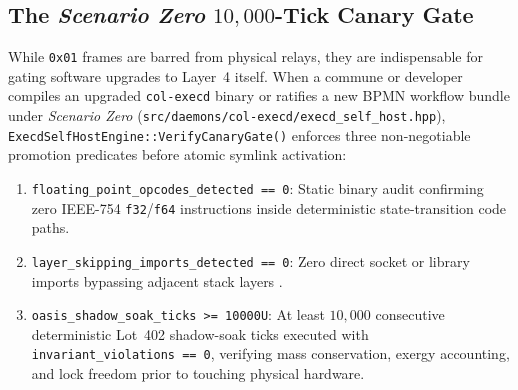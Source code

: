\subsection{The \emph{Scenario Zero} $10{,}000$-Tick Canary Gate}

While \texttt{0x01} frames are barred from physical relays, they are indispensable for gating software upgrades to Layer~4 itself. When a commune or developer compiles an upgraded \texttt{col-execd} binary or ratifies a new BPMN workflow bundle under \emph{Scenario Zero} (\texttt{src/daemons/col-execd/execd\_self\_host.hpp}), \texttt{ExecdSelfHostEngine::VerifyCanaryGate()} enforces three non-negotiable promotion predicates before atomic symlink activation:
\begin{enumerate}
  \item \texttt{floating\_point\_opcodes\_detected == 0}: Static binary audit confirming zero IEEE-754 \texttt{f32}/\texttt{f64} instructions inside deterministic state-transition code paths.
  \item \texttt{layer\_skipping\_imports\_detected == 0}: Zero direct socket or library imports bypassing adjacent stack layers \parencite{saltzer1984end}.
  \item \texttt{oasis\_shadow\_soak\_ticks >= 10000U}: At least $10{,}000$ consecutive deterministic Lot~402 shadow-soak ticks executed with \texttt{invariant\_violations == 0}, verifying mass conservation, exergy accounting, and lock freedom prior to touching physical hardware.
\end{enumerate}

